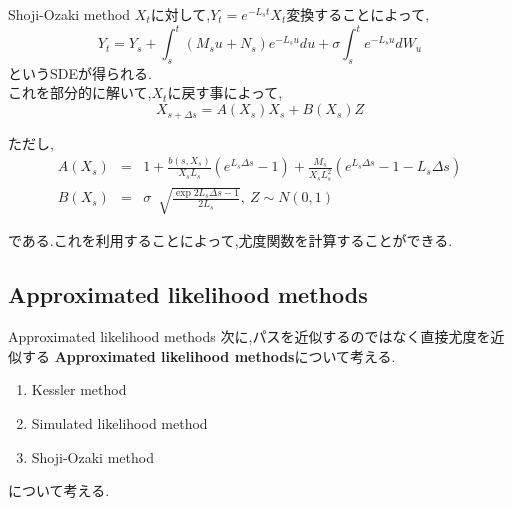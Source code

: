 \documentclass[dvipdfmx,cjk]{beamer}
\numberwithin{equation}{section}
\def\eqa{\begin{eqnarray}}
\def\eqax{\end{eqnarray}}
\begin{document}
\begin{frame}{Shoji-Ozaki method}
$X_t$に対して,$Y_t = e^{-L_s t } X_t $変換することによって,
\[
Y_t = Y_s + \int_s^t (M_s u + N_s ) e^{-L_s u} du + \sigma \int_{s}^t e^{-L_s u} dW_u
\]
というSDEが得られる.\\
\pause
これを部分的に解いて,$X_t$に戻す事によって,
\[
X_{s+\Delta s} = A(X_s)X_s + B(X_s) Z
\]

ただし,
\eqa
A(X_s) &=& 1 + \frac{b(s,X_s)}{X_s L_s} (e^{L_s \Delta s} -1 ) +
\frac{M_s}{X_s L_s^2} (e^{L_s \Delta s} -1  - L_s \Delta s) \\
B(X_s) &=& \sigma\ \sqrt[]{ \frac{\exp{2L_s \Delta s} -1 }{2L_s}},\ Z\sim N(0,1)
\eqax

である.これを利用することによって,尤度関数を計算することができる.

\end{frame}
\subsection{Approximated likelihood methods}
\begin{frame}{Approximated likelihood methods}
次に,パスを近似するのではなく直接尤度を近似する
{\bf Approximated likelihood methods}について考える.
\begin{enumerate}
\item Kessler method
\item Simulated likelihood method
\item Shoji-Ozaki method
\end{enumerate}
について考える.
\end{frame}
\end{document}
